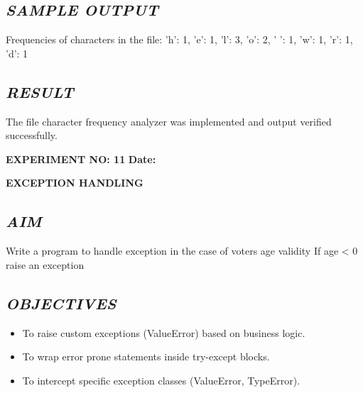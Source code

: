 \documentclass[11pt,a4paper]{article}
\begin{document}
\subsection*{\textit{SAMPLE OUTPUT}}
\begin{tcolorbox}[colback=black!85,colframe=navyblue,title=\textbf{Terminal Output},coltitle=white,fonttitle=\bfseries\small]
\small\ttfamily\color{green!30!white}
Frequencies of characters in the file: {'h': 1, 'e': 1, 'l': 3, 'o': 2, ' ': 1, 'w': 1, 'r': 1, 'd': 1}
\end{tcolorbox}

\subsection*{\textit{RESULT}}
The file character frequency analyzer was implemented and output verified successfully.

\newpage

\noindent
\textbf{\large EXPERIMENT NO: 11} \hfill \textbf{\large Date: \underline{\hspace{3cm}}}

\vspace{0.2cm}
\begin{center}
{\Huge \textbf{\textcolor{navyblue}{EXCEPTION HANDLING}}}
\end{center}
\vspace{0.3cm}

\subsection*{\textit{AIM}}
Write a program to handle exception in the case of voters age validity If age < 0 raise an exception

\subsection*{\textit{OBJECTIVES}}
\begin{itemize}
  \item To raise custom exceptions (ValueError) based on business logic.
  \item To wrap error prone statements inside try-except blocks.
  \item To intercept specific exception classes (ValueError, TypeError).
\end{itemize}
\end{document}
